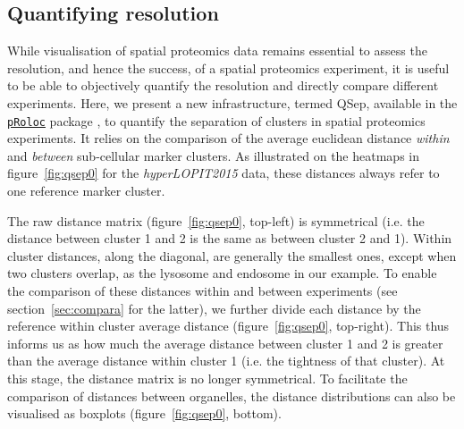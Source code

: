 \documentclass[12pt]{article}\usepackage[]{graphicx}\usepackage[]{color}
\newcommand{\Rpackage}[1]{\texttt{#1}}
\newcommand\Biocpkg[1]{%
  {\href{http://bioconductor.org/packages/#1}%
    {\Rpackage{#1}}}}
\begin{document}
\subsection{Quantifying resolution}\label{sec:qsep}

While visualisation of spatial proteomics data remains essential to
assess the resolution, and hence the success, of a spatial proteomics
experiment, it is useful to be able to objectively quantify the
resolution and directly compare different experiments. Here, we
present a new infrastructure, termed QSep, available in the
\Biocpkg{pRoloc} package \cite{Gatto:2014a}, to quantify the
separation of clusters in spatial proteomics experiments. It relies on
the comparison of the average euclidean distance \textit{within} and
\textit{between} sub-cellular marker clusters. As illustrated on the
heatmaps in figure~\ref{fig:qsep0} for the \textit{hyperLOPIT2015}
data, these distances always refer to one reference marker cluster.

The raw distance matrix (figure~\ref{fig:qsep0}, top-left) is
symmetrical (i.e. the distance between cluster 1 and 2 is the same as
between cluster 2 and 1). Within cluster distances, along the
diagonal, are generally the smallest ones, except when two clusters
overlap, as the lysosome and endosome in our example. To enable the
comparison of these distances within and between experiments (see
section~\ref{sec:compara} for the latter), we further divide each
distance by the reference within cluster average distance
(figure~\ref{fig:qsep0}, top-right). This thus informs us as how much
the average distance between cluster 1 and 2 is greater than the
average distance within cluster 1 (i.e. the tightness of that
cluster). At this stage, the distance matrix is no longer
symmetrical. To facilitate the comparison of distances between
organelles, the distance distributions can also be visualised as
boxplots (figure~\ref{fig:qsep0}, bottom).
\end{document}
